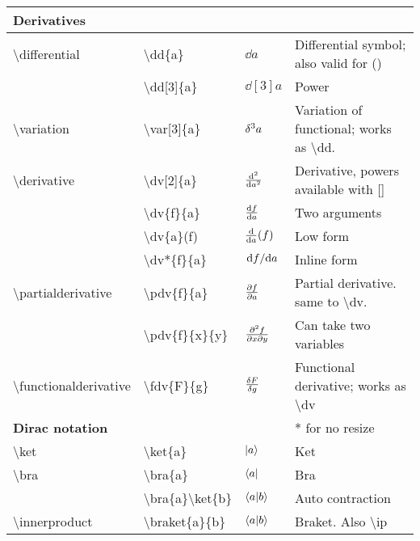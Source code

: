 \documentclass{article}
\def\tbs{\textbackslash}
\begin{document}
\begin{longtable}{l||l|l|p{6cm}}
\textbf{Derivatives}      &                                  &                          &
\\ \hline
\tbs differential         & \tbs dd\{a\}                     & $\dd{a}$                 & Differential symbol; also valid for ()
\\ \hline
                          & \tbs dd[3]\{a\}                  & $\dd[3]{a}$              & Power
\\ \hline
\tbs variation            & \tbs var[3]\{a\}                 & $\var[3]{a}$             & Variation of functional; works as \tbs dd.
\\ \hline
\tbs derivative           & \tbs dv[2]\{a\}                  & $\dv[2]{a}$              & Derivative, powers available with []
\\ \hline
                          & \tbs dv\{f\}\{a\}                & $\dv{f}{a}$              & Two arguments
\\ \hline
                          & \tbs dv\{a\}(f)                  & $\dv{a}(f)$              & Low form
\\ \hline
                          & \tbs dv*\{f\}\{a\}               & $\dv*{f}{a}$             & Inline form
\\ \hline
\tbs partialderivative    & \tbs pdv\{f\}\{a\}               & $\pdv{f}{a}$             & Partial derivative. same to \tbs dv.
\\ \hline
                          & \tbs pdv\{f\}\{x\}\{y\}          & $\pdv{f}{x}{y}$          & Can take two variables
\\ \hline
\tbs functionalderivative & \tbs fdv\{F\}\{g\}               & $\fdv{F}{g}$             & Functional derivative; works as \tbs dv
\\ \hline \hline
\textbf{Dirac notation}   &                                  &                          & * for no resize
\\ \hline
\tbs ket                  & \tbs ket\{a\}                    & $\ket{a}$                & Ket
\\ \hline
\tbs bra                  & \tbs bra\{a\}                    & $\bra{a}$                & Bra
\\ \hline
                          & \tbs bra\{a\}\tbs ket\{b\}       & $\bra{a}\ket{b}$         & Auto contraction
\\ \hline
\tbs innerproduct         & \tbs braket\{a\}\{b\}            & $\braket{a}{b}$          & Braket. Also \tbs ip
\\ \hline

\end{longtable}
\end{document}
